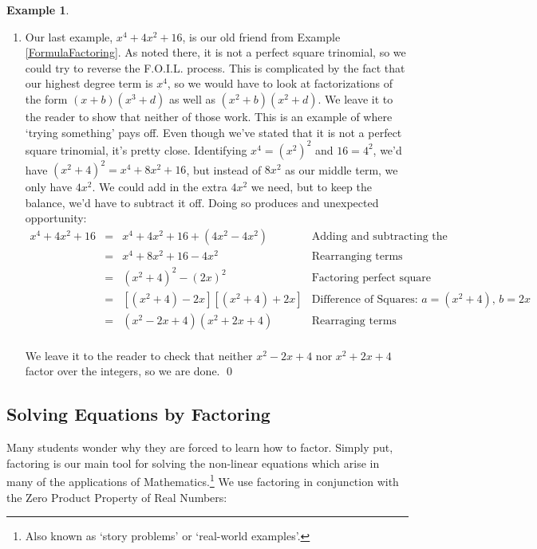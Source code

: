 \documentclass[11pt]{article}
\theoremstyle{definition}  %
\newtheorem{ex}{\bf Example}
\begin{document}
\begin{ex}
\begin{enumerate}
\item  Our last example, $x^4 + 4x^2 + 16$, is our old friend from Example \ref{FormulaFactoring}.  As noted there, it is not a perfect square trinomial, so we could try to reverse the F.O.I.L. process. This is complicated by the fact that our highest degree term is $x^4$, so we would have to look at factorizations of the form $(x+b)(x^3+d)$ as well as $(x^2 + b)(x^2 + d)$.  We leave it to the reader to show that neither of those work.  This is an example of where `trying something' pays off.  Even though we've stated that it is not a perfect square trinomial, it's pretty close.  Identifying $x^4 = (x^2)^2$ and $16 = 4^2$, we'd have $(x^2 + 4)^2 = x^4 + 8x^2 + 16$, but instead of $8x^2$ as our middle term, we only have $4x^2$. We could add in the extra $4x^2$ we need, but to keep the balance, we'd have to subtract it off.  Doing so produces and unexpected opportunity: \[ \begin{array}{rclr}

x^4 + 4x^2 + 16 & = & x^4 + 4x^2 + 16 + (4x^2 - 4x^2) & \text{Adding and subtracting the same term} \\
                & = & x^4 + 8x^2 + 16 - 4x^2 & \text{Rearranging terms} \\
                & = & (x^2 + 4)^2 - (2x)^2 & \text{Factoring perfect square trinomial} \\
								& = & [(x^2 +4) - 2x][ (x^2 + 4) + 2x] & \text{Difference of Squares:  $a= (x^2 + 4)$, $b = 2x$}\\
								& = & (x^2 - 2x + 4)(x^2 + 2x + 4) & \text{Rearraging terms} \\

\end{array}\]

We leave it to the reader to check that neither $x^2 - 2x + 4$ nor $x^2 + 2x + 4$ factor over the integers, so we are done. \qed

\end{enumerate}

\end{ex}

\subsection{Solving Equations by Factoring}
\label{solveeqnsbyfactoring}

Many students wonder why they are forced to learn how to factor.  Simply put, factoring is our main tool for solving the non-linear equations which arise in many of the applications of Mathematics.\footnote{Also known as `story problems' or `real-world examples'.}  We use factoring in conjunction with the Zero Product Property of Real Numbers:
\end{document}
